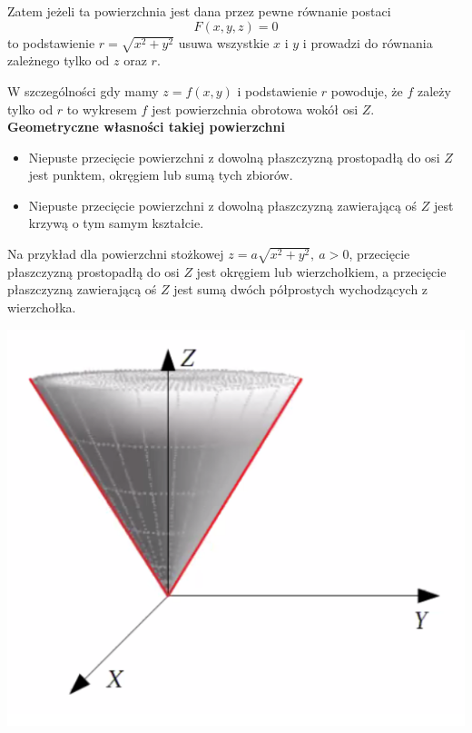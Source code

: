 Zatem jeżeli ta powierzchnia jest dana przez pewne równanie postaci
$$ F(x,y,z) = 0 $$
to podstawienie $ r = \sqrt{x^2 + y^2} $ usuwa wszystkie $x$ i $y$ i prowadzi do równania zależnego tylko od $z$ oraz $r$.

W szczególności gdy mamy $z = f(x,y)$ i podstawienie $r$ powoduje, że $f$ zależy tylko od $r$ to wykresem $f$ jest powierzchnia
obrotowa wokół osi $Z$. \\

\textbf{Geometryczne własności takiej powierzchni}

\begin{itemize}
    \item Niepuste przecięcie powierzchni z dowolną płaszczyzną prostopadłą do osi $Z$ jest punktem, okręgiem lub sumą tych zbiorów.
    \item Niepuste przecięcie powierzchni z dowolną płaszczyzną zawierającą oś $Z$ jest krzywą o tym samym kształcie. \\
\end{itemize}

Na przykład dla powierzchni stożkowej $ z = a\sqrt{x^2 + y^2}, \ a > 0 $, przecięcie płaszczyzną prostopadłą do osi $Z$ jest okręgiem
lub wierzchołkiem, a przecięcie płaszczyzną zawierającą oś $Z$ jest sumą dwóch półprostych wychodzących z wierzchołka.

\begin{center}
\includegraphics[scale=0.6]{img/stozek_wlzm_2.png}
\end{center}

